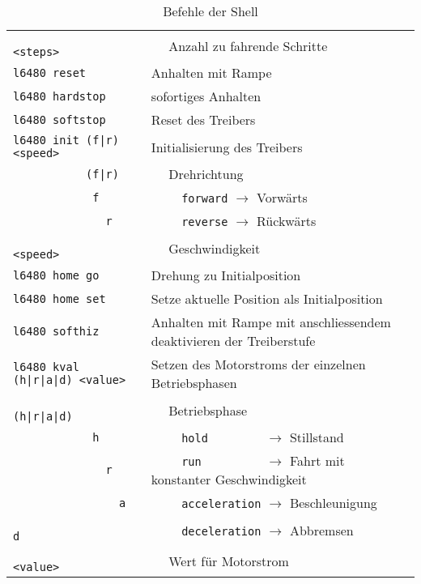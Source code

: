 \begin{table}[h!]
\begin{tabular}{p{}p{}}
            \rowcolor{white} \verb?                 <steps>    ? & $\quad$ Anzahl zu fahrende Schritte \\
            \rowcolor{lgray} \verb?l6480 reset                 ? & Anhalten mit Rampe \\
            \rowcolor{white} \verb?l6480 hardstop              ? & sofortiges Anhalten \\
            \rowcolor{lgray} \verb?l6480 softstop              ? & Reset des Treibers \\
            \rowcolor{white} \verb?l6480 init (f|r) <speed>    ? & Initialisierung des Treibers \\
            \rowcolor{white} \verb?           (f|r)            ? & $\quad$ Drehrichtung \\
            \rowcolor{white} \verb?            f               ?      & $\quad\quad$ \verb?forward? $\to$ Vorwärts \\
            \rowcolor{white} \verb?              r             ?      & $\quad\quad$ \verb?reverse? $\to$ Rückwärts \\
            \rowcolor{white} \verb?                 <speed>    ? & $\quad$ Geschwindigkeit \\
            \rowcolor{lgray} \verb?l6480 home go               ? & Drehung zu Initialposition \\
            \rowcolor{white} \verb?l6480 home set              ? & Setze aktuelle Position als Initialposition \\
            \rowcolor{lgray} \verb?l6480 softhiz               ? & Anhalten mit Rampe mit anschliessendem deaktivieren der Treiberstufe \\
            \rowcolor{white} \verb?l6480 kval (h|r|a|d) <value>? & Setzen des Motorstroms der einzelnen Betriebsphasen \\
            \rowcolor{white} \verb?           (h|r|a|d)        ? & $\quad$ Betriebsphase \\
            \rowcolor{white} \verb?            h               ? & $\quad\quad$ \verb?hold        ? $\to$ Stillstand \\
            \rowcolor{white} \verb?              r             ? & $\quad\quad$ \verb?run         ? $\to$ Fahrt mit konstanter Geschwindigkeit \\
            \rowcolor{white} \verb?                a           ? & $\quad\quad$ \verb?acceleration? $\to$ Beschleunigung \\
            \rowcolor{white} \verb?                  d         ? & $\quad\quad$ \verb?deceleration? $\to$ Abbremsen \\
            \rowcolor{white} \verb?                     <value>? & $\quad$ Wert für Motorstrom \\
        \end{tabular}
        \caption{Befehle der Shell}
        \label{tab:shell_parser}
    \end{table}

